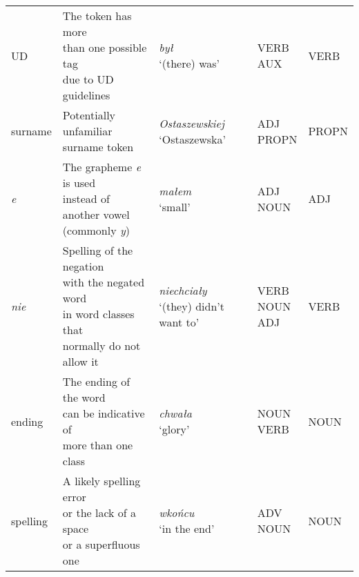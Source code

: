 \begin{longtable}[H]{p{2cm}p{4.5cm}p{3.5cm}p{1.75cm}p{1.75cm}}
UD & \makecell[l]{The token has more \\ than one possible tag \\ due to UD guidelines} & \makecell[l]{\textit{był} \\ `(there) was'} & \makecell[l]{VERB \\ AUX} & VERB \\ 

surname & \makecell[l]{Potentially unfamiliar \\ surname token}  & \makecell[l]{\textit{Ostaszewskiej} \\ `Ostaszewska'} & \makecell[l]{ADJ \\ PROPN} & PROPN \\ 

\textit{e} & \makecell[l]{The grapheme \textit{e} is used \\ instead of another vowel \\ (commonly \textit{y})} & \makecell[l]{\textit{małem} \\ `small'} & \makecell[l]{ADJ \\ NOUN} & ADJ \\ 

\textit{nie} & \makecell[l]{Spelling of the negation \\ with the negated word \\ in word classes that \\ normally do not allow it} & \makecell[l]{\textit{niechciały} \\ `(they) didn't want to'} & \makecell[l]{VERB \\ NOUN \\ ADJ} & VERB  \\ 

ending & \makecell[l]{The ending of the word \\ can be indicative of \\ more than one class} & \makecell[l]{\textit{chwała} \\ `glory'} & \makecell[l]{NOUN \\ VERB} & NOUN \\ 

spelling & \makecell[l]{A likely spelling error \\ or the lack of a space \\ or a superfluous one} & \makecell[l]{\textit{wkońcu} \\ `in the end'} & \makecell[l]{ADV \\ NOUN} & NOUN \\ 


\end{longtable}

